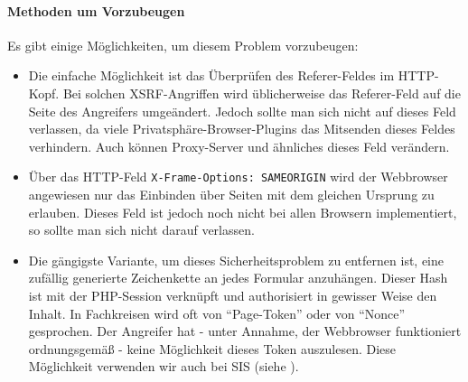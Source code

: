\paragraph{Methoden um Vorzubeugen}
Es gibt einige Möglichkeiten, um diesem Problem vorzubeugen:
\begin{itemize}
	\item Die einfache Möglichkeit ist das Überprüfen des Referer-Feldes im HTTP-Kopf. Bei solchen XSRF-Angriffen wird üblicherweise das Referer-Feld auf die Seite des Angreifers umgeändert. Jedoch sollte man sich nicht auf dieses Feld verlassen, da viele Privatsphäre-Browser-Plugins  das Mitsenden dieses Feldes verhindern. Auch können Proxy-Server und ähnliches dieses Feld verändern.
	\item Über das HTTP-Feld \texttt{X-Frame-Options: SAMEORIGIN} wird der Webbrowser angewiesen nur das Einbinden über Seiten mit dem gleichen Ursprung zu erlauben. Dieses Feld ist jedoch noch nicht bei allen Browsern implementiert, so sollte man sich nicht darauf verlassen.
	\item Die gängigste Variante, um dieses Sicherheitsproblem zu entfernen ist, eine zufällig generierte Zeichenkette an jedes Formular anzuhängen. Dieser Hash ist mit der PHP-Session verknüpft und authorisiert in gewisser Weise den Inhalt. In Fachkreisen wird oft von \enquote{Page-Token} oder von \enquote{Nonce} gesprochen. Der Angreifer hat - unter Annahme, der Webbrowser funktioniert ordnungsgemäß - keine Möglichkeit dieses Token auszulesen. Diese Möglichkeit verwenden wir auch bei SIS (siehe ).
\end{itemize}